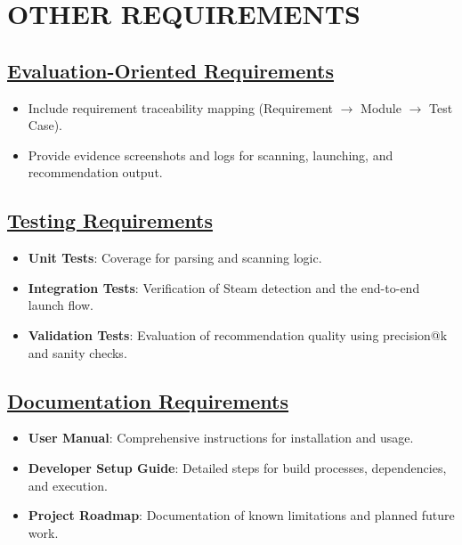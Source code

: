 \section{OTHER REQUIREMENTS}
\subsection{\underline{Evaluation-Oriented Requirements}}
    \begin{itemize}
        \item Include requirement traceability mapping (Requirement $\rightarrow$ Module $\rightarrow$ Test Case).
        \item Provide evidence screenshots and logs for scanning, launching, and recommendation output.
    \end{itemize}

\subsection{\underline{Testing Requirements}}
    \begin{itemize}
        \item \textbf{Unit Tests}: Coverage for parsing and scanning logic.
        \item \textbf{Integration Tests}: Verification of Steam detection and the end-to-end launch flow.
        \item \textbf{Validation Tests}: Evaluation of recommendation quality using precision@k and sanity checks.
    \end{itemize}

    \subsection{\underline{Documentation Requirements}}
    \begin{itemize}
        \item \textbf{User Manual}: Comprehensive instructions for installation and usage.
        \item \textbf{Developer Setup Guide}: Detailed steps for build processes, dependencies, and execution.
        \item \textbf{Project Roadmap}: Documentation of known limitations and planned future work.
    \end{itemize}
